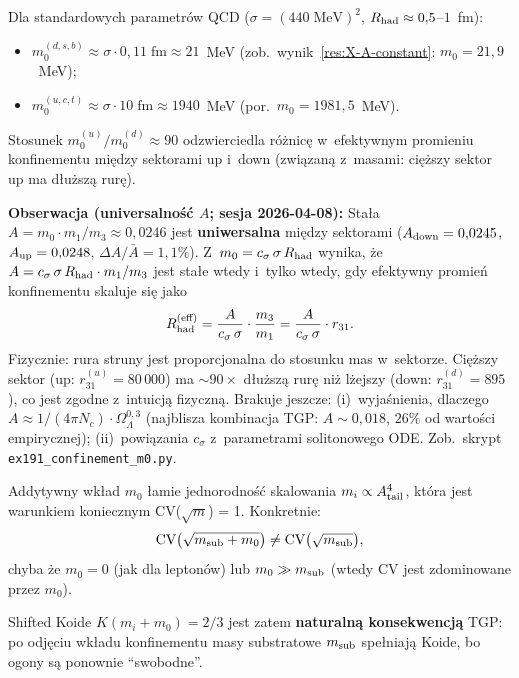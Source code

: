 \begin{uwaga}\label{rem:X-m0-estimates}
Dla standardowych parametr\'ow QCD ($\sigma = (440\;\text{MeV})^2$,
$R_{\rm had} \approx 0{,}5$--$1$~fm):
\begin{itemize}[nosep]
  \item $m_0^{(d,s,b)} \approx \sigma \cdot 0{,}11\;\text{fm}
        \approx 21$~MeV (zob.\ wynik~\ref{res:X-A-constant}: $m_0 = 21{,}9$~MeV);
  \item $m_0^{(u,c,t)} \approx \sigma \cdot 10\;\text{fm} \approx 1940$~MeV
        (por.\ $m_0 = 1981{,}5$~MeV).
\end{itemize}
Stosunek $m_0^{(u)}/m_0^{(d)} \approx 90$ odzwierciedla
r\'o\.znic\k{e} w~efektywnym promieniu konfinementu
mi\k{e}dzy sektorami up i~down (zwi\k{a}zan\k{a}
z~masami: ci\k{e}\.zszy sektor up ma d\l{}u\.zsz\k{a}
rur\k{e}).

\medskip\noindent
\textbf{Obserwacja (universalno\'s\'c $A$; sesja 2026-04-08):}
Sta\l{}a $A = m_0 \cdot m_1/m_3 \approx 0{,}0246$ jest
\textbf{uniwersalna} mi\k{e}dzy sektorami
($A_{\rm down} = 0{,}0245$, $A_{\rm up} = 0{,}0248$,
$\Delta A / \bar A = 1{,}1\%$).
Z~$m_0 = c_\sigma\,\sigma\,R_{\rm had}$ wynika, \.ze
$A = c_\sigma\,\sigma\,R_{\rm had}\cdot m_1/m_3$ jest sta\l{}e wtedy
i~tylko wtedy, gdy efektywny promie\'n konfinementu
skaluje si\k{e} jako
\begin{equation}\label{eq:X-Rhad-scaling}
  R_{\rm had}^{(\rm eff)} = \frac{A}{c_\sigma\,\sigma}
  \cdot \frac{m_3}{m_1} = \frac{A}{c_\sigma\,\sigma}\cdot r_{31}.
\end{equation}
Fizycznie: rura struny jest proporcjonalna do stosunku mas w~sektorze.
Ci\k{e}\.zszy sektor (up: $r_{31}^{(u)} = 80\,000$) ma $\sim 90\times$
d\l{}u\.zsz\k{a} rur\k{e} ni\.z l\.zejszy (down: $r_{31}^{(d)} = 895$),
co jest zgodne z~intuicj\k{a} fizyczn\k{a}.
Brakuje jeszcze: (i)~wyja\'snienia, dlaczego $A \approx 1/(4\pi N_c)
\cdot \Omega_\Lambda^{0{,}3}$ (najblisza kombinacja TGP: $A \sim 0{,}018$,
$26\%$ od warto\'sci empirycznej);
(ii)~powi\k{a}zania $c_\sigma$ z~parametrami solitonowego ODE.
Zob.\ skrypt \texttt{ex191\_confinement\_m0.py}.
\end{uwaga}

\begin{uwaga}\label{rem:X-CV-consequence}
Addytywny wk\l{}ad $m_0$ \l{}amie jednorodność skalowania
$m_i \propto A_{\rm tail}^4$, kt\'ora jest warunkiem koniecznym
CV($\sqrt{m}$) = 1. Konkretnie:
\begin{equation}
  \text{CV}\bigl(\sqrt{m_{\rm sub} + m_0}\bigr) \neq
  \text{CV}\bigl(\sqrt{m_{\rm sub}}\bigr),
\end{equation}
chyba \.ze $m_0 = 0$ (jak dla lepton\'ow) lub $m_0 \gg m_{\rm sub}$
(wtedy CV jest zdominowane przez $m_0$).

Shifted Koide $K(m_i + m_0) = 2/3$ jest zatem \textbf{naturaln\k{a}
konsekwencj\k{a}} TGP: po odj\k{e}ciu wk\l{}adu konfinementu
masy substratowe $m_{\rm sub}$ spe\l{}niaj\k{a} Koide,
bo ogony s\k{a} ponownie ``swobodne''.
\end{uwaga}

